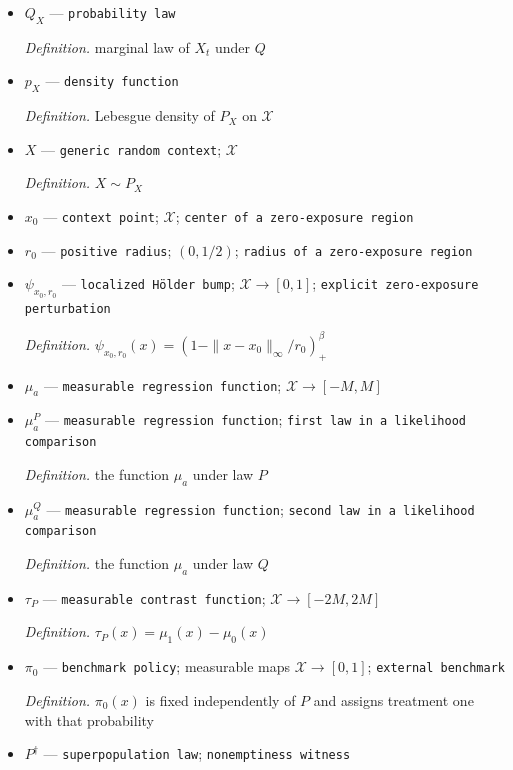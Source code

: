 \documentclass{article}
\begin{document}
\begin{itemize}
  \item \(Q_X\) --- \texttt{probability law}
  \par\smallskip\noindent\emph{Definition.} marginal law of \(X_t\) under \(Q\)
  \item \(p_X\) --- \texttt{density function}
  \par\smallskip\noindent\emph{Definition.} Lebesgue density of \(P_X\) on \(\mathcal X\)
  \item \(X\) --- \texttt{generic random context}; \(\mathcal X\)
  \par\smallskip\noindent\emph{Definition.} \(X\sim P_X\)
  \item \(x_0\) --- \texttt{context point}; \(\mathcal X\); \texttt{center of a zero-\allowbreak{}exposure region}
  \item \(r_0\) --- \texttt{positive radius}; \((0,1/2)\); \texttt{radius of a zero-\allowbreak{}exposure region}
  \item \(\psi_{x_0,r_0}\) --- \texttt{localized Hölder bump}; \(\mathcal X\to[0,1]\); \texttt{explicit zero-\allowbreak{}exposure perturbation}
  \par\smallskip\noindent\emph{Definition.} \(\psi_{x_0,r_0}(x)=(1-\|x-x_0\|_\infty/r_0)_+^\beta\)
  \item \(\mu_a\) --- \texttt{measurable regression function}; \(\mathcal X\to[-M,M]\)
  \item \(\mu_a^P\) --- \texttt{measurable regression function}; \texttt{first law in a likelihood comparison}
  \par\smallskip\noindent\emph{Definition.} the function \(\mu_a\) under law \(P\)
  \item \(\mu_a^Q\) --- \texttt{measurable regression function}; \texttt{second law in a likelihood comparison}
  \par\smallskip\noindent\emph{Definition.} the function \(\mu_a\) under law \(Q\)
  \item \(\tau_P\) --- \texttt{measurable contrast function}; \(\mathcal X\to[-2M,2M]\)
  \par\smallskip\noindent\emph{Definition.} \(\tau_P(x)=\mu_1(x)-\mu_0(x)\)
  \item \(\pi_0\) --- \texttt{benchmark policy}; measurable maps \(\mathcal X\to[0,1]\); \texttt{external benchmark}
  \par\smallskip\noindent\emph{Definition.} \(\pi_0(x)\) is fixed independently of \(P\) and assigns treatment one with that probability
  \item \(P^\dagger\) --- \texttt{superpopulation law}; \texttt{nonemptiness witness}

\end{itemize}
\end{document}
